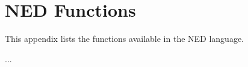 \chapter{NED Functions}
\label{cha:ned-functions}

This appendix lists the functions available in the NED language.

...

